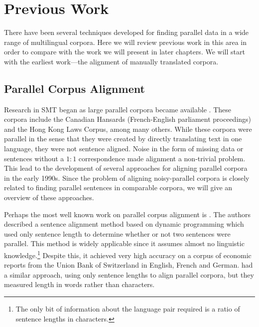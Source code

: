 \chapter{Previous Work}
\label{chap:related_work}
There have been several techniques developed for finding parallel data in a
wide range of multilingual corpora. 
Here we will review previous work in this area in
order to compare with the work we will present in later chapters. We will start
with the earliest work---the alignment of manually translated corpora.

\section{Parallel Corpus Alignment}
\label{sec:parallel_related}

Research in SMT began as large parallel corpora became available
\citep{Brown88,Brown90,Brown93}. These corpora include the Canadian Hansards
(French-English parliament proceedings) and the Hong Kong Laws Corpus, among many
others. While these corpora were parallel in the sense that they were created by
directly translating text in one language, they were not sentence aligned. Noise
in the form of missing data or sentences without a $1:1$ correspondence made
alignment a non-trivial problem. This lead to the development of several
approaches for aligning parallel corpora in the early 1990s. Since the problem
of aligning noisy-parallel corpora is closely related to finding parallel
sentences in comparable corpora, we will give an
overview of these approaches.

Perhaps the most well known work on parallel corpus alignment is \citet{Gale91,Gale93}.
The authors described a sentence alignment method based on dynamic programming
which used only sentence length to determine whether or not two sentences were
parallel. This method is widely applicable since it assumes almost no linguistic
knowledge.\footnote{The only bit of information about the language pair required
is a ratio of sentence lengths in characters.} Despite this, it achieved very
high accuracy on a corpus of economic reports from the Union Bank of Switzerland
in English, French and German. \citet{Brown91} had a similar approach, using
only sentence lengths to align parallel corpora, but they measured length in
words rather than characters.

